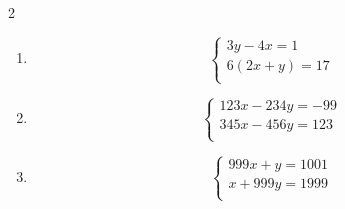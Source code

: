 \begin{exercice}
\begin{multicols}{2}
\begin{enumerate}
$$\begin{array} {l}
   28x-23y-13=0 \\ 
\end{array} \right.$$
\item $$\left\{ \begin{array} {l}
    3y-4x=1 \\ 
   6(2x+y)=17 \\ 
\end{array} \right.$$
\item $$\left\{ \begin{array} {l}
    123x-234y=-99 \\ 
   345x-456y=123 \\ 
\end{array} \right.$$
\item $$\left\{ \begin{array} {l}
    999x+y=1001 \\ 
   x+999y=1999 \\ 
\end{array} \right.$$
\end{enumerate}
\end{multicols}
\end{exercice}

